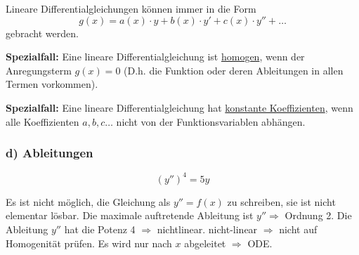 Lineare Differentialgleichungen können immer in die Form 
\begin{equation*}
    g(x) = a(x)\cdot y + b(x) \cdot y' + c(x)\cdot y'' + \ldots
\end{equation*}
gebracht werden.

\textbf{Spezialfall:} Eine lineare Differentialgleichung ist
\underline{homogen}, wenn der Anregungsterm $g(x)=0$ 
(D.h. die Funktion oder deren Ableitungen in allen Termen vorkommen).

\textbf{Spezialfall:} Eine lineare Differentialgleichung hat \underline{%
konstante Koeffizienten}, wenn alle Koeffizienten $a,b,c\ldots$ nicht von der
Funktionsvariablen abhängen.

\subsubsection*{d) Ableitungen}

\begin{equation*}
    \left( y'' \right)^{4} = 5y%
\end{equation*}

\begin{outline}
    \1 Es ist nicht möglich, die Gleichung als $y''=f(x)$ zu schreiben, sie
    ist nicht elementar lösbar.
    \1 Die maximale auftretende Ableitung ist $y''\Rightarrow$ Ordnung 2.
    \1 Die Ableitung $y''$ hat die Potenz 4 $\Rightarrow$ nichtlinear.
    \1 nicht-linear $\Rightarrow$ nicht auf Homogenität prüfen.
    \1 Es wird nur nach $x$ abgeleitet $\Rightarrow$ ODE.
\end{outline}

